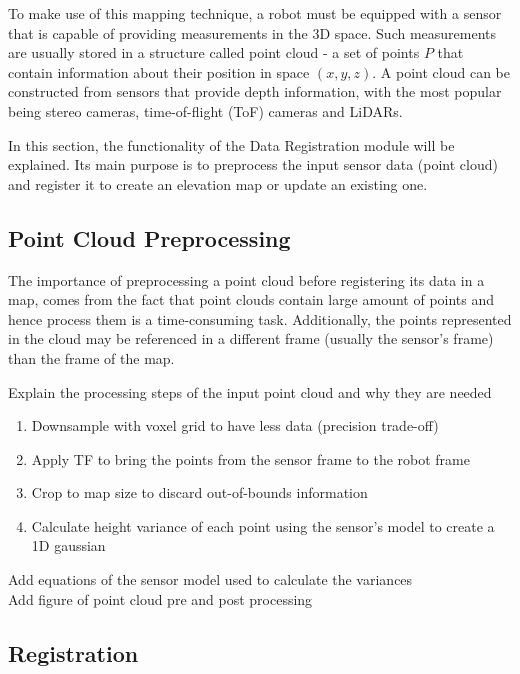 
To make use of this mapping technique, a robot must be equipped with a
sensor that is capable of providing measurements in the 3D space.
Such measurements are usually stored in a structure called point cloud -
a set of points $P$ that contain information about their position in
space $\left(x,y,z\right)$. A point cloud can be constructed from
sensors that provide depth information, with the most popular being stereo
cameras, time-of-flight (ToF) cameras and LiDARs.


In this section, the functionality of the Data Registration module will be
explained. Its main purpose is to preprocess the input sensor data (point
cloud) and register it to create an elevation map or update an existing one.

\subsection{Point Cloud Preprocessing}

The importance of preprocessing a point cloud before registering its data
in a map, comes from the fact that point clouds contain large amount of points
and hence process them is a time-consuming task. Additionally, the
points represented in the cloud may be referenced in a different frame
(usually the sensor's frame) than the frame of the map.

Explain the processing steps of the input point cloud and why they are needed

\begin{enumerate}
    \item Downsample with voxel grid to have less data (precision trade-off)
    \item Apply TF to bring the points from the sensor frame to the robot frame
    \item Crop to map size to discard out-of-bounds information
    \item Calculate height variance of each point using the sensor's model to create a 1D gaussian
\end{enumerate}

\noindent
Add equations of the sensor model used to calculate the variances\\
Add figure of point cloud pre and post processing

\subsection{Registration}

